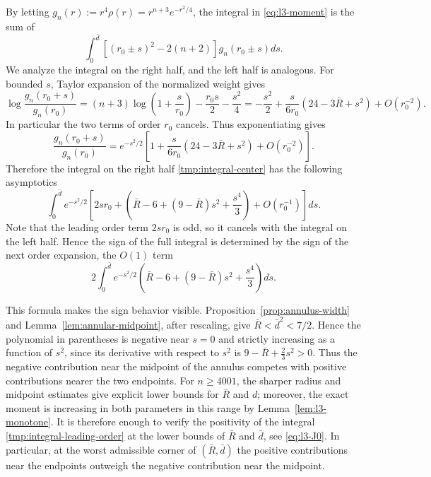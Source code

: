 \documentclass[11pt]{article}
\numberwithin{equation}{section}
\theoremstyle{definition}
\begin{document}
By letting $g_n(r):= r^4 \rho(r) = r^{n+3} e^{-r^2/4}$, the integral in \eqref{eq:l3-moment} is the sum of
\begin{equation}\label{tmp:integral-center}
    \int_0^{\bar{d}} \left[ (r_0 \pm s)^2 - 2(n+2) \right] g_n(r_0\pm s) ds. 
\end{equation} 
We analyze the integral on the right half, and the left half is analogous. For bounded $s$, Taylor expansion of the normalized weight gives
\[
 \log\frac{g_n(r_0+s)}{g_n(r_0)}
 =(n+3)\log\left(1+\frac{s}{r_0}\right)
   -\frac{r_0 s}{2}-\frac{s^2}{4}
 = -\frac{s^2}{2}  + \frac{s}{6r_0} \left(24-3\bar{R} + s^2 \right)  +O(r_0^{-2}).
\]
In particular the two terms of order $r_0$ cancels.
Thus exponentiating gives
\[
 \frac{g_n(r_0+s)}{g_n(r_0)}
 =e^{-s^2/2}\left[
 1+\frac{s}{6r_0} \left(24-3\bar{R} + s^2 \right) +O(r_0^{-2})
 \right].
\]
Therefore the integral on the right half \eqref{tmp:integral-center} has the following asymptotics
\begin{equation}\label{tmp:integral-asymptotics}
    \int_0^{\bar{d}} e^{-s^2/2} \left[ 2sr_0 + \left( \bar{R}-6 + (9-\bar{R}) s^2 + \frac{s^4}{3} \right) + O(r_0^{-1}) \right] ds. 
\end{equation} 
Note that the leading order term $2sr_0$ is odd, so it cancels with the integral on the left half. Hence the sign of the full integral is determined by the sign of the next order expansion, the $O(1)$ term
\begin{equation}\label{tmp:integral-leading-order}
    2 \int_0^{\bar{d}} e^{-s^2/2} \left( \bar{R}-6 + (9-\bar{R}) s^2 + \frac{s^4}{3} \right) ds.
\end{equation} 



This formula makes the sign behavior visible. Proposition~\ref{prop:annulus-width}
and Lemma~\ref{lem:annular-midpoint}, after rescaling, give $\bar{R}<\bar{d}^2<7/2$. Hence the polynomial
in parentheses is negative near $s=0$ and strictly increasing as a function of
$s^2$, since its derivative with respect to $s^2$ is
$9-\bar{R}+\frac23 s^2>0$. Thus the negative contribution near the midpoint of the
annulus competes with positive contributions nearer the two endpoints. For
$n\geq4001$, the sharper radius and midpoint estimates give explicit lower bounds for $\bar{R}$ and $d$; %
moreover, the exact moment is increasing in both parameters in this
range by Lemma~\ref{lem:l3-monotone}. It is therefore enough to verify the positivity of the integral \eqref{tmp:integral-leading-order} at the lower bounds of $\bar{R}$ and $\bar{d}$, see \eqref{eq:l3-J0}.
In particular, at the worst admissible corner of $(\bar{R},\bar{d})$ the
positive contributions near the endpoints outweigh the negative contribution
near the midpoint.
\end{document}
